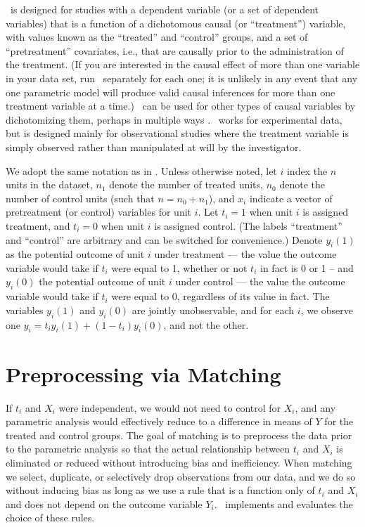 
\MatchIt\ is designed for studies with a dependent variable (or a set
of dependent variables) that is a function of a dichotomous causal (or
``treatment'') variable, with values known as the ``treated'' and
``control'' groups, and a set of ``pretreatment'' covariates, i.e.,
that are causally prior to the administration of the treatment.  (If
you are interested in the causal effect of more than one variable in
your data set, run \MatchIt\ separately for each one; it is unlikely
in any event that any one parametric model will produce valid causal
inferences for more than one treatment variable at a time.)  \MatchIt\
can be used for other types of causal variables by dichotomizing them,
perhaps in multiple ways \citep[see also][]{ImaDyk04}.  \MatchIt\
works for experimental data, but is designed mainly for observational
studies where the treatment variable is simply observed rather than
manipulated at will by the investigator.

We adopt the same notation as in \citet*{HoImaKin06}. Unless otherwise
noted, let $i$ index the $n$ units in the dataset, $n_1$ denote the
number of treated units, $n_0$ denote the number of control units
(such that $n=n_0+n_1$), and $x_i$ indicate a vector of pretreatment
(or control) variables for unit $i$.  Let $t_i=1$ when unit $i$ is
assigned treatment, and $t_i=0$ when unit $i$ is assigned control.
(The labels ``treatment'' and ``control'' are arbitrary and can be
switched for convenience.)  Denote $y_i(1)$ as the potential outcome
of unit $i$ under treatment --- the value the outcome variable would
take if $t_i$ were equal to 1, whether or not $t_i$ in fact is 0 or 1
-- and $y_i(0)$ the potential outcome of unit $i$ under control ---
the value the outcome variable would take if $t_i$ were equal to 0,
regardless of its value in fact.  The variables $y_i(1)$ and $y_i(0)$
are jointly unobservable, and for each $i$, we observe one
$y_i=t_iy_i(1)+(1-t_i)y_i(0)$, and not the other.

\section{Preprocessing via Matching}

If $t_i$ and $X_i$ were independent, we would not need to control for
$X_i$, and any parametric analysis would effectively reduce to a
difference in means of $Y$ for the treated and control groups.  The
goal of matching is to preprocess the data prior to the parametric
analysis so that the actual relationship between $t_i$ and $X_i$ is
eliminated or reduced without introducing bias and inefficiency.  When
matching we select, duplicate, or selectively drop observations from
our data, and we do so without inducing bias as long as we use a rule
that is a function only of $t_i$ and $X_i$ and does not depend on the
outcome variable $Y_i$.  \MatchIt\ implements and evaluates the choice
of these rules.  

